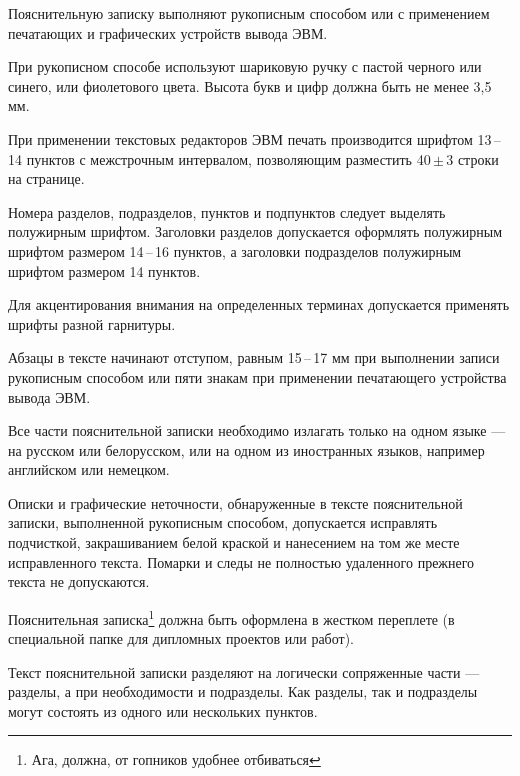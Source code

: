 




\tableofcontents
\newpage


Пояснительную  записку  выполняют  рукописным  способом  или  с применением печатающих и графических устройств вывода ЭВМ. 

При рукописном способе используют шариковую ручку с пастой черного или синего, или фиолетового цвета. Высота букв и цифр должна быть не менее 3,5 мм. 

При применении текстовых редакторов ЭВМ печать производится шрифтом 13\,--\,14  пунктов  с  межстрочным  интервалом,  позволяющим  разместить  
40\,\( \pm \)\,3 строки на странице. 

Номера  разделов,  подразделов,  пунктов и подпунктов следует выделять полужирным  шрифтом.  Заголовки  разделов  допускается  оформлять  полужирным шрифтом размером 14\,--\,16 пунктов, а заголовки подразделов полужирным шрифтом размером 14 пунктов. 

Для  акцентирования  внимания  на  определенных  терминах  допускается применять шрифты разной гарнитуры. 

Абзацы в тексте начинают отступом, равным 15\,--\,17 мм при выполнении  записи  рукописным  способом  или  пяти  знакам  при  применении  печатающего устройства вывода ЭВМ.

Все  части  пояснительной  записки  необходимо  излагать  только  на одном языке --- на русском или белорусском, или на одном из иностранных языков, например английском или немецком.

Описки и графические неточности, обнаруженные в тексте пояснительной записки, выполненной рукописным способом, допускается исправлять подчисткой, закрашиванием белой краской и нанесением на том же месте исправленного текста. Помарки и следы не полностью удаленного прежнего текста не допускаются.

Пояснительная записка\footnote{Ага, должна, от гопников удобнее отбиваться} должна быть оформлена в жестком переплете (в специальной папке для дипломных проектов или работ).

Текст пояснительной записки разделяют на логически сопряженные части --- разделы, а при необходимости и подразделы. Как разделы, так и подразделы могут состоять из одного или нескольких пунктов.

